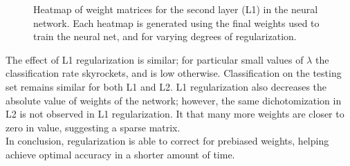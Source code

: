 \documentclass{article}
\begin{document}
\begin{figure}[H]
\caption{Heatmap of weight matrices for the second layer (L1) in the neural network. Each heatmap is generated using the final weights used to train the neural net, and for varying degrees of regularization.}
\label{fig:L1}
\end{figure}

The effect of L1 regularization is similar; for particular small values of $\lambda$ the classification rate skyrockets, and is low otherwise. Classification on the testing set remains similar for both L1 and L2. L1 regularization also decreases the absolute value of weights of the network; however, the same dichotomization in L2 is not observed in L1 regularization. It that many more weights are closer to zero in value, suggesting a sparse matrix.  \\
In conclusion, regularization is able to correct for prebiased weights, helping achieve optimal accuracy in a shorter amount of time.
\end{document}
